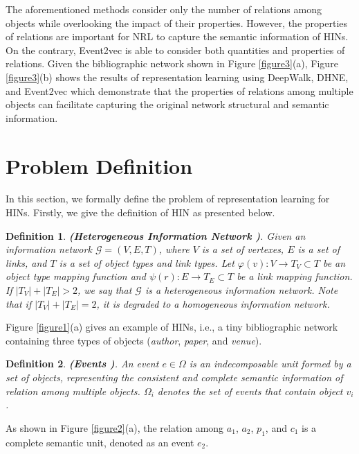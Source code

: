 The aforementioned methods consider only the number of relations among objects while overlooking the impact of their properties. However, the properties of relations are important for NRL to capture the semantic information of HINs. On the contrary, Event2vec is able to consider both quantities and properties of relations. Given the bibliographic network shown in Figure \ref{figure3}(a), Figure \ref{figure3}(b) shows the results of representation learning using DeepWalk, DHNE, and Event2vec which demonstrate that the properties of relations among multiple objects can facilitate capturing the original network structural and semantic information.

\section{Problem Definition}
In this section, we formally define the problem of representation learning for HINs. Firstly, we give the definition of HIN as presented below.
\smallskip

\newtheorem{mydef}{Definition}
\begin{mydef}
	\textbf{(Heterogeneous Information Network \cite{shi2017survey})}. Given an information network $\mathcal{G}=(V, E, T)$, where $V$ is a set of vertexes, $E$ is a set of links, and $T$ is a set of object types and link types. Let $\varphi(v):V\rightarrow T_V\subset T$ be an object type mapping function and $\psi(r): E\rightarrow T_E\subset T$ be a link mapping function. If $|T_V|+|T_E|>2$, we say that $\mathcal{G}$ is a heterogeneous information network. Note that if $|T_V|+|T_E|=2$, it is degraded to a homogeneous information network.
\end{mydef}

Figure \ref{figure1}(a) gives an example of HINs, i.e., a tiny bibliographic network containing three types of objects ({\itshape author}, {\itshape paper}, and {\itshape venue}).

\begin{mydef}
	\textbf{(Events \cite{gui2017embedding})}. An event $e \in \Omega$ is an indecomposable unit formed by a set of objects, representing the consistent and complete semantic information of relation among multiple objects. $\Omega_i$ denotes the set of events that contain object $v_i$.
\end{mydef}

As shown in Figure \ref{figure2}(a), the relation among $a_1$, $a_2$, $p_1$, and $c_1$ is a complete semantic unit, denoted as an event $e_2$.

